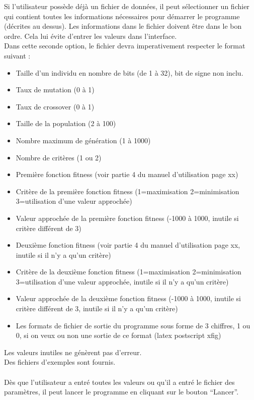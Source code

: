 \documentclass[a4paper,11pt]{article}
\begin{document}
			Si l’utilisateur possède déjà un fichier de données, il peut  sélectionner un fichier qui contient toutes les informations nécessaires pour démarrer le programme (décrites au dessus).
			Les informations dans le fichier doivent être dans le bon ordre.
			Cela lui évite d’entrer les valeurs dans l’interface.\\
			Dans cette seconde option, le fichier devra imperativement respecter le format suivant :
				\begin{itemize}
					\item Taille d'un individu en nombre de bits (de 1 à 32), bit de signe non inclu.
					\item Taux de mutation (0 à 1)
					\item Taux de crossover (0 à 1)
					\item Taille de la population (2 à 100)
					\item Nombre maximum de génération (1 à 1000)
					\item Nombre de critères (1 ou 2)
					\item Première fonction fitness (voir partie 4 du manuel d'utilisation page xx)
					\item Critère de la première fonction fitness (1=maximisation 2=minimisation 3=utilisation d'une valeur approchée)
					\item Valeur approchée de la première fonction fitness (-1000 à 1000, inutile si critère différent de 3)
					\item Deuxième fonction fitness (voir partie 4 du manuel d'utilisation page xx, inutile si il n'y a qu'un critère)
					\item Critère de la deuxième fonction fitness (1=maximisation 2=minimisation 3=utilisation d'une valeur approchée, inutile si il n'y a qu'un critère)
					\item Valeur approchée de la deuxième fonction fitness (-1000 à 1000, inutile si critère différent de 3, inutile si il n'y a qu'un critère)
					\item Les formats de fichier de sortie du programme sous forme de 3 chiffres, 1 ou 0, si on veux ou non une sortie de ce format (latex postscript xfig)
				\end{itemize}
			Les valeurs inutiles ne génèrent pas d'erreur.\\
			Des fichiers d'exemples sont fournis.\\\\
			Dès que l’utilisateur a entré toutes les valeurs ou qu’il a entré le fichier des paramètres, il peut lancer le programme en cliquant sur le bouton “Lancer”.\\
\end{document}
